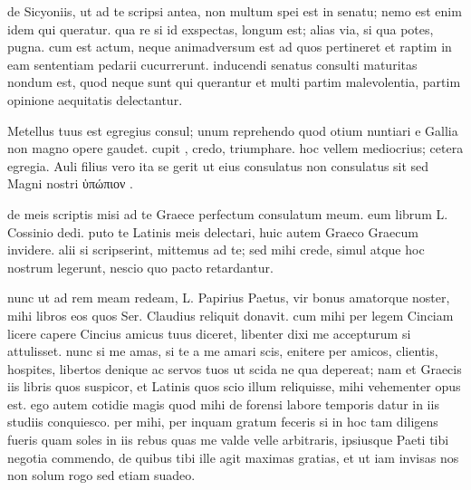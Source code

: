  de Sicyoniis, ut ad te scripsi antea, non multum spei est in senatu; nemo est enim idem qui queratur. qua re si id exspectas, longum est; alias via, si qua potes, pugna. cum est actum, neque animadversum est ad quos pertineret et raptim in eam sententiam pedarii cucurrerunt. inducendi senatus consulti maturitas nondum est, quod neque sunt qui querantur et multi partim malevolentia, partim opinione aequitatis delectantur.

 Metellus tuus est egregius consul; unum reprehendo quod otium nuntiari e Gallia non magno opere gaudet. cupit , credo, triumphare. hoc vellem mediocrius; cetera egregia. Auli filius vero ita se gerit ut eius consulatus non consulatus sit sed Magni nostri ὑπώπιον .

 de meis scriptis misi ad te Graece perfectum consulatum meum. eum librum L. Cossinio dedi. puto te Latinis meis delectari, huic autem Graeco Graecum invidere. alii si scripserint, mittemus ad te; sed mihi crede, simul atque hoc nostrum legerunt, nescio quo pacto retardantur.

 nunc ut ad rem meam redeam, L. Papirius Paetus, vir bonus amatorque noster, mihi libros eos quos Ser. Claudius reliquit donavit. cum mihi per legem Cinciam licere capere Cincius amicus tuus diceret, libenter dixi me accepturum si attulisset. nunc si me amas, si te a me amari scis, enitere per amicos, clientis, hospites, libertos denique ac servos tuos ut scida ne qua depereat; nam et Graecis iis libris quos suspicor, et Latinis quos scio illum reliquisse, mihi vehementer opus est. ego autem cotidie magis quod mihi de forensi labore temporis datur in iis studiis conquiesco. per mihi, per inquam gratum feceris si in hoc tam diligens fueris quam soles in iis rebus quas me valde velle arbitraris, ipsiusque Paeti tibi negotia commendo, de quibus tibi ille agit maximas gratias, et ut iam invisas nos non solum rogo sed etiam suadeo.
